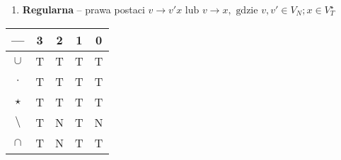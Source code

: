 \documentclass[12pt]{article}
\begin{document}
\begin{enumerate}
\begin{enumerate}[noitemsep, label=\arabic*]
            \item \textbf{Regularna} -- prawa postaci
            $v \rightarrow v'x \text{ lub } v \rightarrow x, \text{ gdzie } v,v' \in V_N;x \in V_T^\star$
        \end{enumerate}
        \begin{center}
            \begin{tabular}{|c c c c c|}
                \hline
                ---         & 3 & 2 & 1 & 0 \\ [0.5ex]
                \hline\hline
                $\cup$      & T & T & T & T \\
                \hline
                $\cdot$     & T & T & T & T \\
                \hline
                $\star$     & T & T & T & T \\
                \hline
                $\setminus$ & T & N & T & N \\
                \hline
                $\cap $     & T & N & T & T \\ [1ex]
                \hline
            \end{tabular}
        \end{center}
    \end{enumerate}
\end{document}
